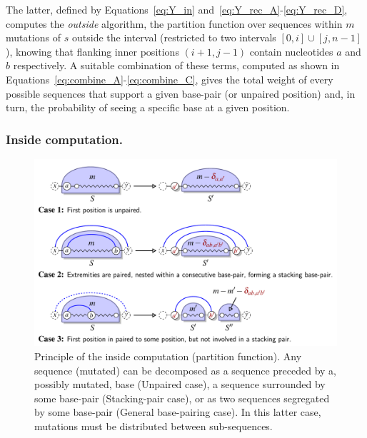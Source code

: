 The latter, defined by Equations~\eqref{eq:Y_in} and~\eqref{eq:Y_rec_A}-\eqref{eq:Y_rec_D},
 computes the \emph{outside} algorithm,   
the partition function over sequences within $m$ mutations of $s$ outside the interval (restricted to two intervals $[0,i]\cup[j,n-1]$), 
knowing  that flanking inner positions $(i+1,j-1)$ contain nucleotides $a$ and $b$ respectively. A suitable combination of these terms, computed as shown in Equations~\eqref{eq:combine_A}-\eqref{eq:combine_C}, gives the total weight of every possible sequences that support a given base-pair (or unpaired position) and, in turn, the probability of seeing a specific base at a given position.





\subsubsection{Inside computation.}
\begin{figure}[t]\centering
\includegraphics[scale=\ScaleDP]{FigDPInsideWrapper}
\caption{Principle of the inside computation (partition function). Any sequence (mutated)  
can be decomposed as a sequence preceded by a, possibly mutated, base 
(Unpaired case), a sequence surrounded by some base-pair (Stacking-pair case), 
or as two sequences segregated by some base-pair (General base-pairing case). In this latter case, mutations must be distributed between sub-sequences.\label{fig:inside}}
\end{figure}

